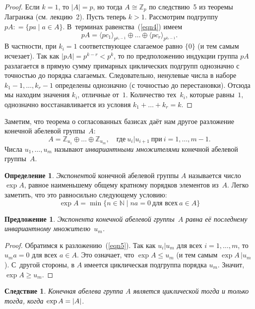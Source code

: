 \documentclass[a4paper,10pt]{amsart}
\def\ZZ{{\mathbb Z}}%
\def\NN{{\mathbb N}}%
\newtheorem{proposition}{Предложение}
\newtheorem{corollary}{Следствие}
\theoremstyle{definition}
\newtheorem{definition}{Определение}
\theoremstyle{remark}
\begin{document}
\begin{proof}
Если $k = 1$, то $|A| = p$, но тогда $A \cong \ZZ_p$ по следствию~5
из теоремы Лагранжа (см. лекцию~2). Пусть теперь $k > 1$. Рассмотрим
подгруппу $pA: = \{ pa \mid a \in A \}$. В~терминах
равенства~(\ref{eqn4}) имеем
$$
pA = \langle pc_1 \rangle_{p^{k_1-1}} \oplus \ldots \oplus \langle
pc_r\rangle_{p^{k_r-1}}.
$$
В частности, при $k_i = 1$ соответствующее слагаемое равно $\lbrace
0 \rbrace$ (и тем самым исчезает). Так как $|pA| = p^{k - r} < p^k$,
то по предположению индукции группа $pA$ разлагается в прямую сумму
примарных циклических подгрупп однозначно с точностью до порядка
слагаемых. Следовательно, ненулевые числа в наборе $k_1 - 1, \ldots,
k_r-1$ определены однозначно (с точностью до перестановки). Отсюда
мы находим значения $k_i$, отличные от~$1$. Количество тех~$k_i$,
которые равны~$1$, однозначно восстанавливается из условия $k_1 +
\ldots + k_r = k$.
\end{proof}

Заметим, что теорема о согласованных базисах даёт нам другое
разложение конечной абелевой группы~$A$:
\begin{equation} \label{eqn5}
A=\ZZ_{u_1}\oplus\ldots\oplus\ZZ_{u_m}, \quad \text{где} \
u_i|u_{i+1} \ \text{при} \ i = 1, \ldots, m-1.
\end{equation}
Числа $u_1, \ldots, u_m$ называют {\it инвариантными множителями}
конечной абелевой группы~$A$.

\begin{definition}
{\it Экспонентой} конечной абелевой группы $A$ называется число
$\exp A$, равное наименьшему общему кратному порядков элементов
из~$A$. Легко заметить, что это равносильно следующему условию:
$$
\exp A = \min \lbrace n \in \NN \mid na = 0 \
\text{для всех} \ a \in A \rbrace
$$
\end{definition}

\begin{proposition}
Экспонента конечной абелевой группы~$A$ равна её последнему
инвариантному множителю~$u_m$.
\end{proposition}

\begin{proof}
Обратимся к разложению~(\ref{eqn5}). Так как $u_i | u_m$ для всех $i
= 1, \ldots, m$, то $u_ma=0$ для всех $a \in A$. Это означает, что
$\exp A \leqslant u_m$ (и тем самым $\exp A \, | u_m$). С~другой
стороны, в $A$ имеется циклическая подгруппа порядка $u_m$. Значит,
$\exp A \geqslant u_m$.
\end{proof}

\begin{corollary}
Конечная абелева группа $A$ является циклической тогда и только
тогда, когда $\exp A =\nobreak |A|$.
\end{corollary}
\end{document}

